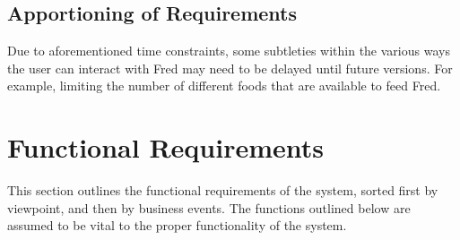 \documentclass[]{article}
\begin{document}
\subsection{Apportioning of Requirements}
\label{sub:apportioning_of_requirements}
	Due to aforementioned time constraints, some subtleties within the various 
	ways the user can interact with Fred may need to be delayed until future 
	versions. For example, limiting the number of different foods that are 
	available to feed Fred.


\section{Functional Requirements}

This section outlines the functional requirements of the system, sorted first by viewpoint, and then by business events.
The functions outlined below are assumed to be vital to the proper functionality of the system.
\end{document}
